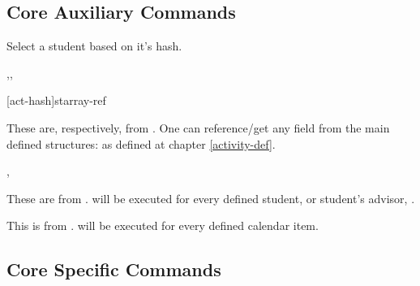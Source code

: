 \documentclass[article,nogeometry,english,tocdepth=3,secdepth=3]{ufrgscca} %
\begin{document}
\subsection{Core Auxiliary Commands}


\begin{codedescribe}[code,new=2023/11/18]{\studentselect}
	\begin{codesyntax}%
	\end{codesyntax}
Select a student based on it's hash.
\end{codedescribe}




\begin{codedescribe}[code,new=2023/11/18]{\DataFields,\eDataSet,\eDataFields}
	\begin{codesyntax}%
    \tsmacro{\eDataSet}[act-hash]{starray-ref}
	\end{codesyntax}
These are, respectively,  from . One can reference/get any field from the main  defined structures:  as defined at chapter \ref{activity-def}.
\end{codedescribe}


\begin{codedescribe}[code,new=2023/11/18,update=2023/12/02]{\studentiterate,\studentadvisoriterate}
	\begin{codesyntax}%
	\end{codesyntax}
These are  from .  will be executed for every defined student, \tsobj{\studentiterate} or student's advisor, \tsobj{\studentadvisoriterate}.
\end{codedescribe}

\begin{codedescribe}[code,new=2023/11/29]{\ActivityCalendarIterate}
	\begin{codesyntax}%
	\end{codesyntax}
This is  from .  will be executed for every defined calendar item.
\end{codedescribe}


\subsection{Core Specific Commands}\label{core-specific-commands}
\end{document}
